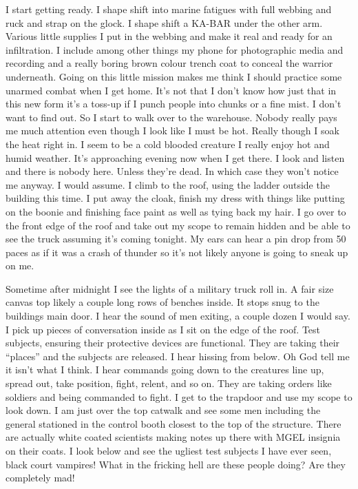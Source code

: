 I start getting ready. I shape shift into marine fatigues with full webbing and ruck and strap on the glock. I shape shift a KA-BAR under the other arm. Various little supplies I put in the webbing and make it real and ready for an infiltration. I include among other things my phone for photographic media and recording and a really boring brown colour trench coat to conceal the warrior underneath. Going on this little mission makes me think I should practice some unarmed combat when I get home. It's not that I don't know how just that in this new form it's a toss-up if I punch people into chunks or a fine mist. I don't want to find out.
So I start to walk over to the warehouse. Nobody really pays me much attention even though I look like I must be hot. Really though I soak the heat right in. I seem to be a cold blooded creature I really enjoy hot and humid weather. It's approaching evening now when I get there. I look and listen and there is nobody here. Unless they're dead. In which case they won't notice me anyway. I would assume. I climb to the roof, using the ladder outside the building this time. I put away the cloak, finish my dress with things like putting on the boonie and finishing face paint as well as tying back my hair. I go over to the front edge of the roof and take out my scope to remain hidden and be able to see the truck assuming it's coming tonight. My ears can hear a pin drop from 50 paces as if it was a crash of thunder so it's not likely anyone is going to sneak up on me.

Sometime after midnight I see the lights of a military truck roll in. A fair size canvas top likely a couple long rows of benches inside. It stops snug to the buildings main door. I hear the sound of men exiting, a couple dozen I would say. I pick up pieces of conversation inside as I sit on the edge of the roof. Test subjects, ensuring their protective devices are functional. They are taking their ``places'' and the subjects are released. I hear hissing from below. Oh God tell me it isn't what I think. I hear commands going down to the creatures line up, spread out, take position, fight, relent, and so on. They are taking orders like soldiers and being commanded to fight. I get to the trapdoor and use my scope to look down. I am just over the top catwalk and see some men including the general stationed in the control booth closest to the top of the structure. There are actually white coated scientists making notes up there with MGEL insignia on their coats. I look below and see the ugliest test subjects I have ever seen, black court vampires! What in the fricking hell are these people doing? Are they completely mad!

